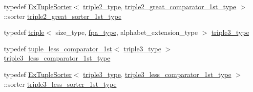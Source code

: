 \begin{DoxyCompactItemize}
\item 
typedef \hyperlink{struct_ex_tuple_sorter}{Ex\+Tuple\+Sorter}$<$ \hyperlink{class_validate4_a1e1065b2bd86208beeec8aea6edd3ddd}{triple2\+\_\+type}, \hyperlink{class_validate4_a17f3f46281d706a75c002eed273aeaf8}{triple2\+\_\+great\+\_\+comparator\+\_\+1st\+\_\+type} $>$\+::sorter \hyperlink{class_validate4_aa35a0ebf404821377118043d536be262}{triple2\+\_\+great\+\_\+sorter\+\_\+1st\+\_\+type}
\item 
typedef \hyperlink{structtriple}{triple}$<$ size\+\_\+type, \hyperlink{common_8h_a7fdaf8b9b3d2f6ae6b10597a8d3f96ee}{fpa\+\_\+type}, alphabet\+\_\+extension\+\_\+type $>$ \hyperlink{class_validate4_a2bc9345c182543a419af47b6c8bd37d2}{triple3\+\_\+type}
\item 
typedef \hyperlink{structtuple__less__comparator__1st}{tuple\+\_\+less\+\_\+comparator\+\_\+1st}$<$ \hyperlink{class_validate4_a2bc9345c182543a419af47b6c8bd37d2}{triple3\+\_\+type} $>$ \hyperlink{class_validate4_a473516f742b15338b55ec169c794f7ca}{triple3\+\_\+less\+\_\+comparator\+\_\+1st\+\_\+type}
\item 
typedef \hyperlink{struct_ex_tuple_sorter}{Ex\+Tuple\+Sorter}$<$ \hyperlink{class_validate4_a2bc9345c182543a419af47b6c8bd37d2}{triple3\+\_\+type}, \hyperlink{class_validate4_a473516f742b15338b55ec169c794f7ca}{triple3\+\_\+less\+\_\+comparator\+\_\+1st\+\_\+type} $>$\+::sorter \hyperlink{class_validate4_ac2e4bde5df51eeff18ef5591d76e63dc}{triple3\+\_\+less\+\_\+sorter\+\_\+1st\+\_\+type}
\end{DoxyCompactItemize}
